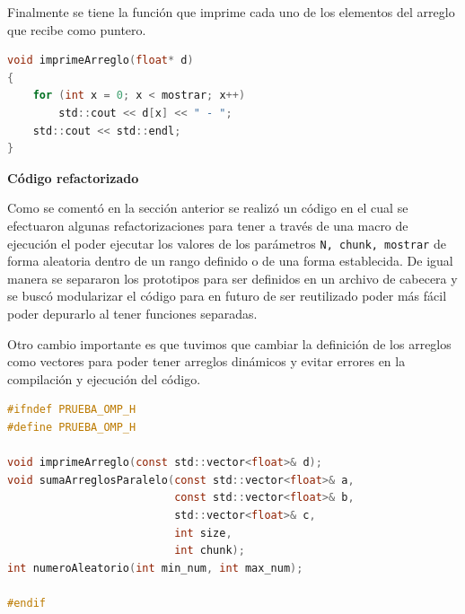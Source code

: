 \documentclass[12pt,a4paper]{article}
\begin{document}
\vspace{1em}

Finalmente se tiene la función que imprime cada uno de los elementos del arreglo que recibe como puntero.

\begin{lstlisting}[language=C, numbers=none]
void imprimeArreglo(float* d)
{
    for (int x = 0; x < mostrar; x++)
        std::cout << d[x] << " - ";
    std::cout << std::endl;
}
\end{lstlisting}

\vspace{1em}

\textbf{Código refactorizado}

\vspace{1em}

Como se comentó en la sección anterior se realizó un código en el cual se efectuaron algunas refactorizaciones para tener a través de una macro de ejecución el poder ejecutar los valores de los parámetros \texttt{N, chunk, mostrar}  de forma aleatoria dentro de un rango definido o de una forma establecida. De igual manera se separaron los prototipos para ser definidos en un archivo de cabecera y se buscó modularizar el código para en futuro de ser reutilizado poder más fácil poder depurarlo al tener funciones separadas.

Otro cambio importante es que tuvimos que cambiar la definición de los arreglos como vectores para poder tener arreglos dinámicos y evitar errores en la compilación y ejecución del código.

\vspace{1em}
 
\begin{lstlisting}[language=C, numbers=none]
#ifndef PRUEBA_OMP_H
#define PRUEBA_OMP_H

void imprimeArreglo(const std::vector<float>& d);
void sumaArreglosParalelo(const std::vector<float>& a, 
                          const std::vector<float>& b, 
                          std::vector<float>& c, 
                          int size,
                          int chunk);
int numeroAleatorio(int min_num, int max_num);

#endif
\end{lstlisting}
\end{document}
